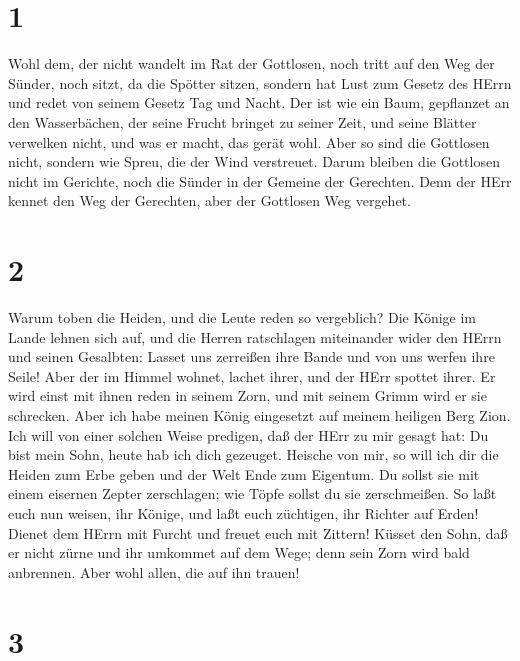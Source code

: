 \hypertarget{section}{%
\section{1}\label{section}}

 Wohl dem, der nicht wandelt im Rat der Gottlosen, noch
tritt auf den Weg der Sünder, noch sitzt, da die Spötter sitzen,
 sondern hat Lust zum Gesetz des HErrn und redet von seinem
Gesetz Tag und Nacht.  Der ist wie ein Baum, gepflanzet an
den Wasserbächen, der seine Frucht bringet zu seiner Zeit, und seine
Blätter verwelken nicht, und was er macht, das gerät wohl. 
Aber so sind die Gottlosen nicht, sondern wie Spreu, die der Wind
verstreuet.  Darum bleiben die Gottlosen nicht im Gerichte,
noch die Sünder in der Gemeine der Gerechten.  Denn der HErr
kennet den Weg der Gerechten, aber der Gottlosen Weg vergehet.

\hypertarget{section-1}{%
\section{2}\label{section-1}}

 Warum toben die Heiden, und die Leute reden so vergeblich?
 Die Könige im Lande lehnen sich auf, und die Herren
ratschlagen miteinander wider den HErrn und seinen Gesalbten:
 Lasset uns zerreißen ihre Bande und von uns werfen ihre
Seile!  Aber der im Himmel wohnet, lachet ihrer, und der
HErr spottet ihrer.  Er wird einst mit ihnen reden in seinem
Zorn, und mit seinem Grimm wird er sie schrecken.  Aber ich
habe meinen König eingesetzt auf meinem heiligen Berg Zion. 
Ich will von einer solchen Weise predigen, daß der HErr zu mir gesagt
hat: Du bist mein Sohn, heute hab ich dich gezeuget. 
Heische von mir, so will ich dir die Heiden zum Erbe geben und der Welt
Ende zum Eigentum.  Du sollst sie mit einem eisernen Zepter
zerschlagen; wie Töpfe sollst du sie zerschmeißen.  So laßt
euch nun weisen, ihr Könige, und laßt euch züchtigen, ihr Richter auf
Erden!  Dienet dem HErrn mit Furcht und freuet euch mit
Zittern!  Küsset den Sohn, daß er nicht zürne und ihr
umkommet auf dem Wege; denn sein Zorn wird bald anbrennen. Aber wohl
allen, die auf ihn trauen!

\hypertarget{section-2}{%
\section{3}\label{section-2}}

